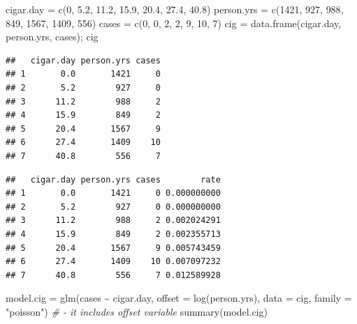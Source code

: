\documentclass[
]{book}
\makeatletter
\newenvironment{Shaded}{\begin{snugshade}}{\end{snugshade}}
\newcommand{\AttributeTok}[1]{\textcolor[rgb]{0.61,0.61,0.61}{#1}}
\newcommand{\CommentTok}[1]{\textcolor[rgb]{0.37,0.37,0.37}{\textit{#1}}}
\newcommand{\DecValTok}[1]{\textcolor[rgb]{0.06,0.06,0.06}{#1}}
\newcommand{\FloatTok}[1]{\textcolor[rgb]{0.06,0.06,0.06}{#1}}
\newcommand{\FunctionTok}[1]{\textcolor[rgb]{0,0,0}{#1}}
\newcommand{\NormalTok}[1]{#1}
\newcommand{\OtherTok}[1]{\textcolor[rgb]{0.37,0.37,0.37}{#1}}
\newcommand{\SpecialCharTok}[1]{\textcolor[rgb]{0,0,0}{#1}}
\newcommand{\StringTok}[1]{\textcolor[rgb]{0.5,0.5,0.5}{#1}}
\newenvironment{kframe}{%
\medskip{}
\setlength{\fboxsep}{.8em}
 \def\at@end@of@kframe{}%
 \ifinner\ifhmode%
  \def\at@end@of@kframe{\end{minipage}}%
  \begin{minipage}{\columnwidth}%
 \fi\fi%
 \def\FrameCommand##1{\hskip\@totalleftmargin \hskip-\fboxsep
 \colorbox{shadecolor}{##1}\hskip-\fboxsep
     \hskip-\linewidth \hskip-\@totalleftmargin \hskip\columnwidth}%
 \MakeFramed {\advance\hsize-\width
   \@totalleftmargin\z@ \linewidth\hsize
   \@setminipage}}%
 {\par\unskip\endMakeFramed%
 \at@end@of@kframe}
\renewenvironment{Shaded}{\begin{kframe}}{\end{kframe}}
\makeatother
\begin{document}
\begin{Shaded}
\begin{Highlighting}[]
\NormalTok{cigar.day }\OtherTok{=} \FunctionTok{c}\NormalTok{(}\DecValTok{0}\NormalTok{, }\FloatTok{5.2}\NormalTok{, }\FloatTok{11.2}\NormalTok{, }\FloatTok{15.9}\NormalTok{, }\FloatTok{20.4}\NormalTok{, }\FloatTok{27.4}\NormalTok{, }\FloatTok{40.8}\NormalTok{)}
\NormalTok{person.yrs }\OtherTok{=} \FunctionTok{c}\NormalTok{(}\DecValTok{1421}\NormalTok{, }\DecValTok{927}\NormalTok{, }\DecValTok{988}\NormalTok{, }\DecValTok{849}\NormalTok{, }\DecValTok{1567}\NormalTok{, }\DecValTok{1409}\NormalTok{, }\DecValTok{556}\NormalTok{)}
\NormalTok{cases }\OtherTok{=} \FunctionTok{c}\NormalTok{(}\DecValTok{0}\NormalTok{, }\DecValTok{0}\NormalTok{, }\DecValTok{2}\NormalTok{, }\DecValTok{2}\NormalTok{, }\DecValTok{9}\NormalTok{, }\DecValTok{10}\NormalTok{, }\DecValTok{7}\NormalTok{)}
\NormalTok{cig }\OtherTok{=} \FunctionTok{data.frame}\NormalTok{(cigar.day, person.yrs, cases); cig}
\end{Highlighting}
\end{Shaded}

\begin{verbatim}
##   cigar.day person.yrs cases
## 1       0.0       1421     0
## 2       5.2        927     0
## 3      11.2        988     2
## 4      15.9        849     2
## 5      20.4       1567     9
## 6      27.4       1409    10
## 7      40.8        556     7
\end{verbatim}

\begin{Shaded}
\end{Shaded}

\begin{verbatim}
##   cigar.day person.yrs cases        rate
## 1       0.0       1421     0 0.000000000
## 2       5.2        927     0 0.000000000
## 3      11.2        988     2 0.002024291
## 4      15.9        849     2 0.002355713
## 5      20.4       1567     9 0.005743459
## 6      27.4       1409    10 0.007097232
## 7      40.8        556     7 0.012589928
\end{verbatim}

\begin{Shaded}
\begin{Highlighting}[]
\NormalTok{model.cig }\OtherTok{=} \FunctionTok{glm}\NormalTok{(cases }\SpecialCharTok{\textasciitilde{}}\NormalTok{ cigar.day, }\AttributeTok{offset =} \FunctionTok{log}\NormalTok{(person.yrs), }
                \AttributeTok{data =}\NormalTok{ cig, }\AttributeTok{family =} \StringTok{"poisson"}\NormalTok{)}
\CommentTok{\# {-} it includes offset variable}
\FunctionTok{summary}\NormalTok{(model.cig)}
\end{Highlighting}
\end{Shaded}
\end{document}
